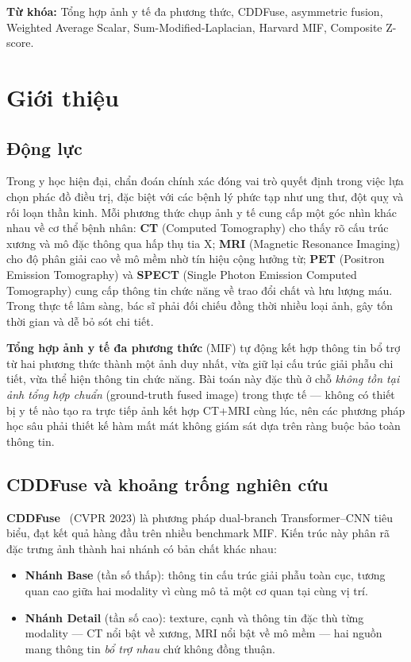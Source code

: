 \documentclass[12pt,a4paper]{article}
\begin{document}
\smallskip\noindent\textbf{Từ khóa:} Tổng hợp ảnh y tế đa phương thức, CDDFuse, asymmetric fusion, Weighted Average Scalar, Sum-Modified-Laplacian, Harvard MIF, Composite Z-score.

\section{Giới thiệu}
\label{sec:intro}

\subsection{Động lực}

Trong y học hiện đại, chẩn đoán chính xác đóng vai trò quyết định trong việc lựa
chọn phác đồ điều trị, đặc biệt với các bệnh lý phức tạp như ung thư, đột quỵ
và rối loạn thần kinh. Mỗi phương thức chụp ảnh y tế cung cấp một góc nhìn khác
nhau về cơ thể bệnh nhân: \textbf{CT} (Computed Tomography) cho thấy rõ cấu trúc
xương và mô đặc thông qua hấp thụ tia X; \textbf{MRI} (Magnetic Resonance Imaging)
cho độ phân giải cao về mô mềm nhờ tín hiệu cộng hưởng từ; \textbf{PET} (Positron
Emission Tomography) và \textbf{SPECT} (Single Photon Emission Computed Tomography)
cung cấp thông tin chức năng về trao đổi chất và lưu lượng máu. Trong thực tế lâm
sàng, bác sĩ phải đối chiếu đồng thời nhiều loại ảnh, gây tốn thời gian và dễ bỏ
sót chi tiết.

\textbf{Tổng hợp ảnh y tế đa phương thức} (MIF) tự động kết hợp thông tin bổ trợ
từ hai phương thức thành một ảnh duy nhất, vừa giữ lại cấu trúc giải phẫu chi tiết,
vừa thể hiện thông tin chức năng. Bài toán này đặc thù ở chỗ \emph{không tồn tại
ảnh tổng hợp chuẩn} (ground-truth fused image) trong thực tế --- không có thiết bị
y tế nào tạo ra trực tiếp ảnh kết hợp CT+MRI cùng lúc, nên các phương pháp học
sâu phải thiết kế hàm mất mát không giám sát dựa trên ràng buộc bảo toàn thông tin.

\subsection{CDDFuse và khoảng trống nghiên cứu}

\textbf{CDDFuse}~\cite{zhao2023cddfuse} (CVPR 2023) là phương pháp dual-branch
Transformer--CNN tiêu biểu, đạt kết quả hàng đầu trên nhiều benchmark MIF. Kiến
trúc này phân rã đặc trưng ảnh thành hai nhánh có bản chất khác nhau:
\begin{itemize}\itemsep1pt
  \item \textbf{Nhánh Base} (tần số thấp): thông tin cấu trúc giải phẫu toàn cục,
        tương quan cao giữa hai modality vì cùng mô tả một cơ quan tại cùng vị trí.
  \item \textbf{Nhánh Detail} (tần số cao): texture, cạnh và thông tin đặc thù
        từng modality --- CT nổi bật về xương, MRI nổi bật về mô mềm --- hai
        nguồn mang thông tin \emph{bổ trợ nhau} chứ không đồng thuận.
\end{itemize}
\end{document}
